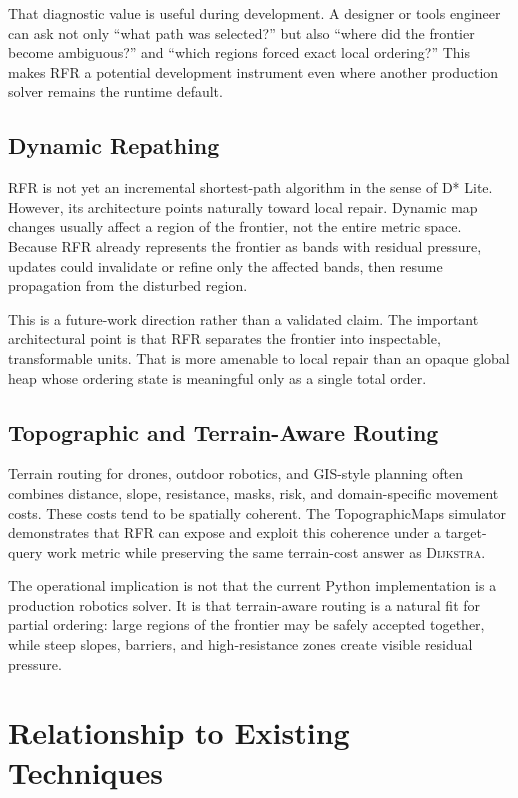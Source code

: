\documentclass[11pt]{article}
\newcommand{\RFR}{\textsc{RFR}}
\newcommand{\Dijkstra}{\textsc{Dijkstra}}
\begin{document}
That diagnostic value is useful during development. A designer or tools engineer can ask not only ``what path was selected?'' but also ``where did the frontier become ambiguous?'' and ``which regions forced exact local ordering?'' This makes \RFR{} a potential development instrument even where another production solver remains the runtime default.

\subsection{Dynamic Repathing}

\RFR{} is not yet an incremental shortest-path algorithm in the sense of D* Lite. However, its architecture points naturally toward local repair. Dynamic map changes usually affect a region of the frontier, not the entire metric space. Because \RFR{} already represents the frontier as bands with residual pressure, updates could invalidate or refine only the affected bands, then resume propagation from the disturbed region.

This is a future-work direction rather than a validated claim. The important architectural point is that \RFR{} separates the frontier into inspectable, transformable units. That is more amenable to local repair than an opaque global heap whose ordering state is meaningful only as a single total order.

\subsection{Topographic and Terrain-Aware Routing}

Terrain routing for drones, outdoor robotics, and GIS-style planning often combines distance, slope, resistance, masks, risk, and domain-specific movement costs. These costs tend to be spatially coherent. The TopographicMaps simulator demonstrates that \RFR{} can expose and exploit this coherence under a target-query work metric while preserving the same terrain-cost answer as \Dijkstra{}.

The operational implication is not that the current Python implementation is a production robotics solver. It is that terrain-aware routing is a natural fit for partial ordering: large regions of the frontier may be safely accepted together, while steep slopes, barriers, and high-resistance zones create visible residual pressure.

\section{Relationship to Existing Techniques}
\end{document}
